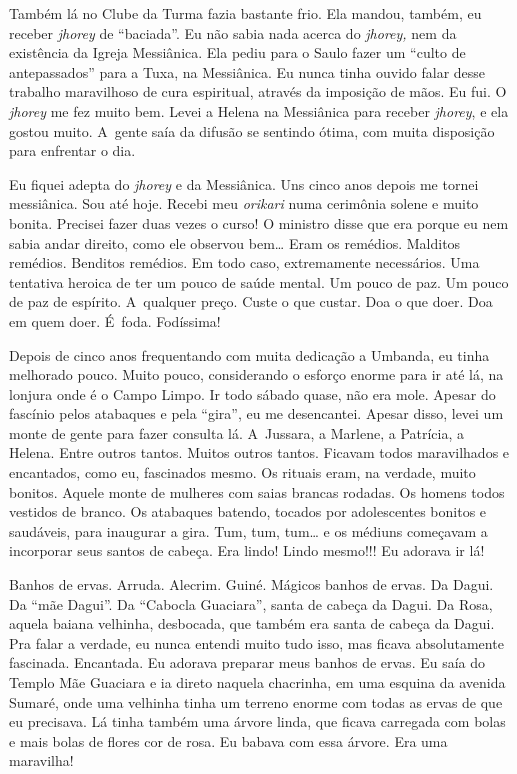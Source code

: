 Também lá no Clube da Turma fazia bastante frio. Ela mandou, também, eu
receber \emph{jhorey} de ``baciada''. Eu não sabia nada acerca do
\emph{jhorey,} nem da existência da Igreja Messiânica. Ela pediu para o
Saulo fazer um ``culto de antepassados'' para a Tuxa, na Messiânica. Eu
nunca tinha ouvido falar desse trabalho maravilhoso de cura espiritual,
através da imposição de mãos. Eu fui. O \emph{jhorey} me fez muito bem.
Levei a Helena na Messiânica para receber \emph{jhorey}, e ela gostou
muito. A~gente saía da difusão se sentindo ótima, com muita disposição
para enfrentar o dia.

Eu fiquei adepta do \emph{jhorey} e da Messiânica. Uns cinco anos depois
me tornei messiânica. Sou até hoje. Recebi meu \emph{orikari} numa
cerimônia solene e muito bonita. Precisei fazer duas vezes o curso! O
ministro disse que era porque eu nem sabia andar direito, como ele
observou bem… Eram os remédios. Malditos remédios. Benditos
remédios. Em todo caso, extremamente necessários. Uma tentativa heroica
de ter um pouco de saúde mental. Um pouco de paz. Um pouco de paz de
espírito. A~qualquer preço. Custe o que custar. Doa o que doer. Doa em
quem doer. É~foda. Fodíssima!

Depois de cinco anos frequentando com muita dedicação a Umbanda, eu
tinha melhorado pouco. Muito pouco, considerando o esforço enorme para
ir até lá, na lonjura onde é o Campo Limpo. Ir todo sábado quase, não
era mole. Apesar do fascínio pelos atabaques e pela ``gira'', eu me
desencantei. Apesar disso, levei um monte de gente para fazer consulta
lá. A~Jussara, a Marlene, a Patrícia, a Helena. Entre outros tantos.
Muitos outros tantos. Ficavam todos maravilhados e encantados, como eu,
fascinados mesmo. Os rituais eram, na verdade, muito bonitos. Aquele
monte de mulheres com saias brancas rodadas. Os homens todos vestidos de
branco. Os atabaques batendo, tocados por adolescentes bonitos e
saudáveis, para inaugurar a gira. Tum, tum, tum… e os médiuns
começavam a incorporar seus santos de cabeça. Era lindo! Lindo mesmo!!!
Eu adorava ir lá!

Banhos de ervas. Arruda. Alecrim. Guiné. Mágicos banhos de ervas. Da
Dagui. Da ``mãe Dagui''. Da ``Cabocla Guaciara'', santa de cabeça da
Dagui. Da Rosa, aquela baiana velhinha, desbocada, que também era santa
de cabeça da Dagui. Pra falar a verdade, eu nunca entendi muito tudo
isso, mas ficava absolutamente fascinada. Encantada. Eu adorava preparar
meus banhos de ervas. Eu saía do Templo Mãe Guaciara e ia direto naquela
chacrinha, em uma esquina da avenida Sumaré, onde uma velhinha tinha um
terreno enorme com todas as ervas de que eu precisava. Lá tinha também
uma árvore linda, que ficava carregada com bolas e mais bolas de flores
cor de rosa. Eu babava com essa árvore. Era uma maravilha!

